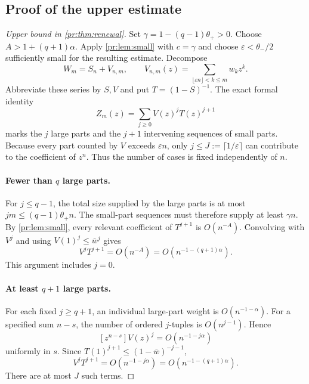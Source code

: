 \documentclass[11pt,a4paper]{article}
\theoremstyle{definition}\newaliascnt{definition}{theorem}
\theoremstyle{remark}\newaliascnt{remark}{theorem}
\newcommand{\prcoef}[2]{[#1^{#2}]}
\begin{document}
\subsection{Proof of the upper estimate}
\begin{proof}[Upper bound in \cref{pr:thm:renewal}]
Set $\gamma=1-(q-1)\theta_+>0$. Choose $A>1+(q+1)\alpha$. Apply
\cref{pr:lem:small} with $c=\gamma$ and choose $\varepsilon<\theta_-/2$
sufficiently small for the resulting estimate. Decompose
\[
 W_m=S_n+V_{n,m},\qquad
 V_{n,m}(z)=\sum_{\lfloor\varepsilon n\rfloor<k\le m}w_kz^k.
\]
Abbreviate these series by $S,V$ and put $T=(1-S)^{-1}$. The exact formal
identity
\begin{equation}
 Z_m(z)=\sum_{j\ge0}V(z)^jT(z)^{j+1}
 \label{pr:eq:markedexpansion}
\end{equation}
marks the $j$ large parts and the $j+1$ intervening sequences of small
parts. Because every part counted by $V$ exceeds $\varepsilon n$, only
$j\le J:=\lceil1/\varepsilon\rceil$ can contribute to the coefficient of
$z^n$. Thus the number of cases is fixed independently of $n$.

\paragraph{Fewer than $q$ large parts.}
For $j\le q-1$, the total size supplied by the large parts is at most
$jm\le(q-1)\theta_+n$. The small-part sequences must therefore supply at
least $\gamma n$. By \cref{pr:lem:small}, every relevant coefficient of
$T^{j+1}$ is $O(n^{-A})$. Convolving with $V^j$ and using
$V(1)^j\le\bar w^j$ gives
\begin{equation}
 \prcoef zn V^jT^{j+1}=O(n^{-A})
 =O(n^{-1-(q+1)\alpha}).
 \label{pr:eq:fewlarge}
\end{equation}
This argument includes $j=0$.

\paragraph{At least $q+1$ large parts.}
For each fixed $j\ge q+1$, an individual large-part weight is
$O(n^{-1-\alpha})$. For a specified sum $n-s$, the number of ordered
$j$-tuples is $O(n^{j-1})$. Hence
\[
 \prcoef z{n-s} V(z)^j=O(n^{-1-j\alpha})
\]
uniformly in $s$. Since $T(1)^{j+1}\le(1-\bar w)^{-j-1}$,
\begin{equation}
 \prcoef zn V^jT^{j+1}=O(n^{-1-j\alpha})
 =O(n^{-1-(q+1)\alpha}).
 \label{pr:eq:manylarge}
\end{equation}
There are at most $J$ such terms.


\end{proof}
\end{document}
